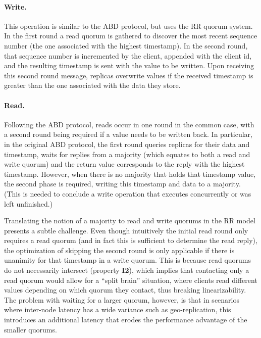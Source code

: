 \paragraph{Write.}  This operation is similar to the ABD
protocol, but uses the \ac{RR} quorum system. In the first round
a read quorum is gathered to discover the most recent sequence number
(the one associated with the highest timestamp).  In the second round,
that sequence number is incremented by the client, appended with the
client id, and the resulting timestamp is sent with the value to be
written. Upon receiving this second round message, replicas overwrite
values if the received timestamp is greater than the one associated
with the data they store.


\paragraph{Read.} Following the ABD protocol, reads occur in one
round in the common case, with a second round being required if a
value needs to be written back. In particular, in the original ABD
protocol, the first round queries replicas for their data and
timestamp, waits for replies from a majority (which equates to both a
read and write quorum) and the return value corresponds to the reply
with the highest timestamp. However, when there is no majority that
holds that timestamp value, the second phase is required, writing this
timestamp and data to a majority. (This is needed to conclude a write
operation that executes concurrently or was left unfinished.)

Translating the notion of a majority to read and write quorums in the
\ac{RR} model presents a subtle challenge. Even though
intuitively the initial read round only requires a read quorum (and in
fact this is sufficient to determine the read reply), the optimization
of skipping the second round is only applicable if there is unanimity
for that timestamp in a write quorum. This is because read quorums do
not necessarily intersect (property \textbf{I2}), which implies that
contacting only a read quorum would allow for a ``split brain''
situation, where clients read different values depending on which
quorum they contact, thus breaking linearizability. The problem with
waiting for a larger quorum, however, is that in scenarios
where inter-node latency has a wide variance such as geo-replication,
this introduces an additional latency that erodes the performance
advantage of the smaller quorums.%

